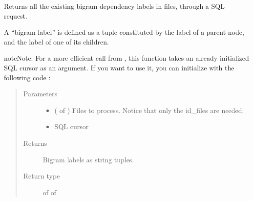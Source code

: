 \documentclass[letterpaper,10pt,english]{sphinxmanual}
\begin{document}

\begin{fulllineitems}
\label{\detokenize{analysis:loacore.analysis.frequencies.get_bigram_label_set}}
Returns all the existing bigram dependency labels in files, through a SQL request.

A “bigram label” is defined as a tuple constituted by the label of a parent node, and the label of one of its
children.

\begin{sphinxadmonition}{note}{Note:}
For a more efficient call from {\hyperref[\detokenize{analysis:loacore.analysis.frequencies.bigram_label_frequencies}]{}}, this function takes an already initialized SQL
cursor as an argument.
If you want to use it, you can initialize  with the following code :

%
\begin{sphinxVerbatim}[commandchars=\\\{\}]
   
   
  
  
\end{sphinxVerbatim}
\end{sphinxadmonition}
\begin{quote}\begin{description}
\item[{Parameters}] \leavevmode\begin{itemize}
\item {} 
 ( of {\hyperref[\detokenize{classes:loacore.classes.classes.File}]{}}) \textendash{} Files to process. Notice that only the id\_files are needed.

\item {} 
 \textendash{} SQL cursor

\end{itemize}

\item[{Returns}] \leavevmode
Bigram labels as string tuples.

\item[{Return type}] \leavevmode
{} of  of 

\end{description}\end{quote}

\end{fulllineitems}
\end{document}
